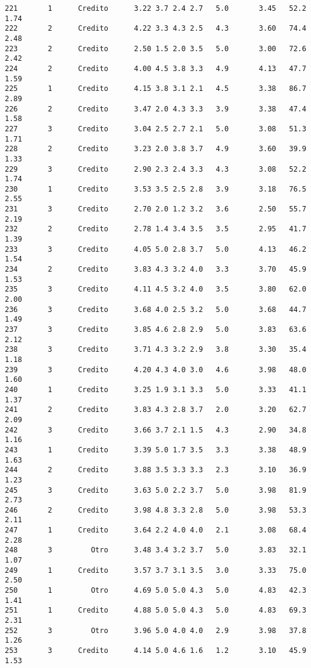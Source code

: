 \documentclass[
  letterpaper,
  DIV=11,
  numbers=noendperiod]{scrartcl}
\begin{document}
\begin{verbatim}
221       1      Credito      3.22 3.7 2.4 2.7   5.0       3.45   52.2    1.74
222       2      Credito      4.22 3.3 4.3 2.5   4.3       3.60   74.4    2.48
223       2      Credito      2.50 1.5 2.0 3.5   5.0       3.00   72.6    2.42
224       2      Credito      4.00 4.5 3.8 3.3   4.9       4.13   47.7    1.59
225       1      Credito      4.15 3.8 3.1 2.1   4.5       3.38   86.7    2.89
226       2      Credito      3.47 2.0 4.3 3.3   3.9       3.38   47.4    1.58
227       3      Credito      3.04 2.5 2.7 2.1   5.0       3.08   51.3    1.71
228       2      Credito      3.23 2.0 3.8 3.7   4.9       3.60   39.9    1.33
229       3      Credito      2.90 2.3 2.4 3.3   4.3       3.08   52.2    1.74
230       1      Credito      3.53 3.5 2.5 2.8   3.9       3.18   76.5    2.55
231       3      Credito      2.70 2.0 1.2 3.2   3.6       2.50   55.7    2.19
232       2      Credito      2.78 1.4 3.4 3.5   3.5       2.95   41.7    1.39
233       3      Credito      4.05 5.0 2.8 3.7   5.0       4.13   46.2    1.54
234       2      Credito      3.83 4.3 3.2 4.0   3.3       3.70   45.9    1.53
235       3      Credito      4.11 4.5 3.2 4.0   3.5       3.80   62.0    2.00
236       3      Credito      3.68 4.0 2.5 3.2   5.0       3.68   44.7    1.49
237       3      Credito      3.85 4.6 2.8 2.9   5.0       3.83   63.6    2.12
238       3      Credito      3.71 4.3 3.2 2.9   3.8       3.30   35.4    1.18
239       3      Credito      4.20 4.3 4.0 3.0   4.6       3.98   48.0    1.60
240       1      Credito      3.25 1.9 3.1 3.3   5.0       3.33   41.1    1.37
241       2      Credito      3.83 4.3 2.8 3.7   2.0       3.20   62.7    2.09
242       3      Credito      3.66 3.7 2.1 1.5   4.3       2.90   34.8    1.16
243       1      Credito      3.39 5.0 1.7 3.5   3.3       3.38   48.9    1.63
244       2      Credito      3.88 3.5 3.3 3.3   2.3       3.10   36.9    1.23
245       3      Credito      3.63 5.0 2.2 3.7   5.0       3.98   81.9    2.73
246       2      Credito      3.98 4.8 3.3 2.8   5.0       3.98   53.3    2.11
247       1      Credito      3.64 2.2 4.0 4.0   2.1       3.08   68.4    2.28
248       3         Otro      3.48 3.4 3.2 3.7   5.0       3.83   32.1    1.07
249       1      Credito      3.57 3.7 3.1 3.5   3.0       3.33   75.0    2.50
250       1         Otro      4.69 5.0 5.0 4.3   5.0       4.83   42.3    1.41
251       1      Credito      4.88 5.0 5.0 4.3   5.0       4.83   69.3    2.31
252       3         Otro      3.96 5.0 4.0 4.0   2.9       3.98   37.8    1.26
253       3      Credito      4.14 5.0 4.6 1.6   1.2       3.10   45.9    1.53

\end{verbatim}
\end{document}

